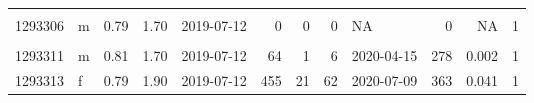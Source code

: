 \documentclass[
  authoryear,
  review,
  3p]{elsarticle}
\begin{document}
\begin{table}[H]
\begin{tabular}{llrrlrrrlrrr}
\cellcolor[HTML]{E2E2E2}{\textcolor{black}{1293310}} & \cellcolor[HTML]{E2E2E2}{\textcolor{black}{m}} & \cellcolor[HTML]{E2E2E2}{\textcolor{black}{0.72}} & \cellcolor[HTML]{E2E2E2}{\textcolor{black}{1.40}} & \cellcolor[HTML]{E2E2E2}{\textcolor{black}{2019-07-11}} & \cellcolor[HTML]{E2E2E2}{\textcolor{black}{0}} & \cellcolor[HTML]{E2E2E2}{\textcolor{black}{0}} & \cellcolor[HTML]{E2E2E2}{\textcolor{black}{0}} & \cellcolor[HTML]{E2E2E2}{\textcolor{black}{NA}} & \cellcolor[HTML]{E2E2E2}{\textcolor{black}{32}} & \cellcolor[HTML]{E2E2E2}{\textcolor{black}{NA}} & \cellcolor[HTML]{E2E2E2}{\textcolor{black}{1}}\\
1293306 & m & 0.79 & 1.70 & 2019-07-12 & 0 & 0 & 0 & NA & 0 & NA & 1\\
\cellcolor[HTML]{E2E2E2}{\textcolor{black}{1293312}} & \cellcolor[HTML]{E2E2E2}{\textcolor{black}{f}} & \cellcolor[HTML]{E2E2E2}{\textcolor{black}{0.91}} & \cellcolor[HTML]{E2E2E2}{\textcolor{black}{2.80}} & \cellcolor[HTML]{E2E2E2}{\textcolor{black}{2019-07-12}} & \cellcolor[HTML]{E2E2E2}{\textcolor{black}{0}} & \cellcolor[HTML]{E2E2E2}{\textcolor{black}{0}} & \cellcolor[HTML]{E2E2E2}{\textcolor{black}{0}} & \cellcolor[HTML]{E2E2E2}{\textcolor{black}{NA}} & \cellcolor[HTML]{E2E2E2}{\textcolor{black}{25}} & \cellcolor[HTML]{E2E2E2}{\textcolor{black}{NA}} & \cellcolor[HTML]{E2E2E2}{\textcolor{black}{1}}\\
1293311 & m & 0.81 & 1.70 & 2019-07-12 & 64 & 1 & 6 & 2020-04-15 & 278 & 0.002 & 1\\
1293313 & f & 0.79 & 1.90 & 2019-07-12 & 455 & 21 & 62 & 2020-07-09 & 363 & 0.041 & 1\\
\bottomrule
\end{tabular}
\end{table}
\end{document}
